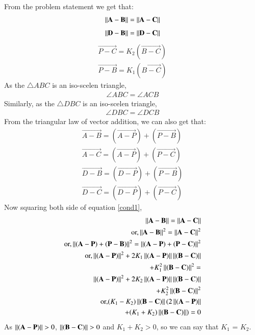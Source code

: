\documentclass[journal,12pt,twocolumn]{IEEEtran}
\begin{document}
From the problem statement we get that:
\begin{equation}
\begin{aligned}
\left\lVert\mathbf{A}-\mathbf{B}\right\rVert = \left\lVert\mathbf{A}-\mathbf{C}\right\rVert
\end{aligned}
\end{equation}
\label{cond1}
\begin{align}
\left\lVert\mathbf{D}-\mathbf{B}\right\rVert = \left\lVert\mathbf{D}-\mathbf{C}\right\rVert
\end{align}
\label{cond2}
\begin{align}
\vec{P-C} = K_2 (\vec{B-C})\\
\vec{P-B} = K_1 (\vec{B-C})
\end{align}
As the $\triangle ABC$ is an iso-scelen triangle,
\begin{align}
\angle ABC = \angle ACB
\end{align}
Similarly, as the $\triangle DBC$ is an iso-scelen triangle,
\begin{align}
\angle DBC = \angle DCB
\end{align}
From the triangular law of vector addition, we can also get that:
\begin{align}
\vec{A-B} = (\vec{A-P}) + (\vec{P-B})\\
\vec{A-C} = (\vec{A-P}) + (\vec{P-C})\\
\vec{D-B} = (\vec{D-P}) + (\vec{P-B})\\
\vec{D-C} = (\vec{D-P}) + (\vec{P-C})
\end{align}
Now squaring both side of equation \ref{cond1}, 
\begin{align}
\left\lVert\mathbf{A}-\mathbf{B}\right\rVert =\left\lVert\mathbf{A}-\mathbf{C}\right\rVert\\
\text{or,}\left\lVert\mathbf{A}-\mathbf{B}\right\rVert^2 = \left\lVert\mathbf{A}-\mathbf{C}\right\rVert^2\\
\text{or,}\left\lVert(\mathbf{A-P}) + (\mathbf{P-B})\right\rVert^2 = \left\lVert(\mathbf{A-P}) + (\mathbf{P-C})\right\rVert^2\\
\text{or,}\left\lVert(\mathbf{A-P})\right\rVert^2 + 2K_1\left\lVert(\mathbf{A-P})\right\rVert\left\lVert(\mathbf{B-C})\right\rVert \\
+ K_1^2\left\lVert(\mathbf{B-C})\right\rVert^2 =\\
 \left\lVert(\mathbf{A-P})\right\rVert^2 + 2K_2\left\lVert(\mathbf{A-P})\right\rVert\left\lVert(\mathbf{B-C})\right\rVert \\
 + K_2^2\left\lVert(\mathbf{B-C})\right\rVert^2\\
\text{or,}(K_1-K_2)\left\lVert(\mathbf{B-C})\right\rVert(2\left\lVert(\mathbf{A-P})\right\rVert \\
+ (K_1+K_2)\left\lVert(\mathbf{B-C})\right\rVert) = 0
\end{align}
As $\left\lVert(\mathbf{A-P})\right\rVert > 0$, $\left\lVert(\mathbf{B-C})\right\rVert > 0$ and $K_1 + K_2 > 0$, so we can say that $K_1$ = $K_2$.
\end{document}

